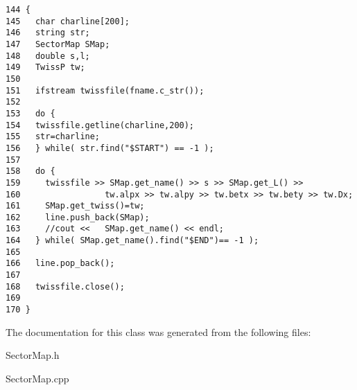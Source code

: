 \footnotesize\begin{verbatim}144 {
145   char charline[200];
146   string str;
147   SectorMap SMap;
148   double s,l;
149   TwissP tw; 
150 
151   ifstream twissfile(fname.c_str());
152 
153   do {
154   twissfile.getline(charline,200);
155   str=charline;
156   } while( str.find("$START") == -1 );
157 
158   do {
159     twissfile >> SMap.get_name() >> s >> SMap.get_L() >> 
160                 tw.alpx >> tw.alpy >> tw.betx >> tw.bety >> tw.Dx; 
161     SMap.get_twiss()=tw;
162     line.push_back(SMap);
163     //cout <<   SMap.get_name() << endl;
164   } while( SMap.get_name().find("$END")== -1 ); 
165 
166   line.pop_back();
167 
168   twissfile.close();
169 
170 }
\end{verbatim}\normalsize 


The documentation for this class was generated from the following files:\begin{CompactItemize}
\item 
Sector\-Map.h\item 
Sector\-Map.cpp\end{CompactItemize}
